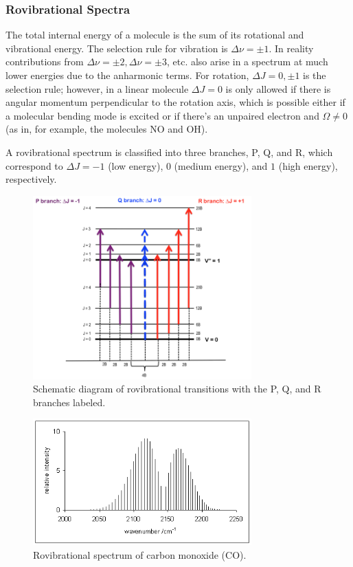 \documentclass{article}
\begin{document}
\subsubsection{Rovibrational Spectra}

The total internal energy of a molecule is the sum of its rotational and vibrational energy. The selection rule for vibration is  $\Delta \nu = \pm 1$. In reality contributions from $\Delta \nu = \pm 2, \Delta \nu = \pm 3$, etc. also arise in a spectrum at much lower energies due to the anharmonic terms. For rotation, $\Delta J = 0, \pm 1$ is the selection rule; however, in a linear molecule $\Delta J = 0$ is only allowed if there is angular momentum perpendicular to the rotation axis, which is possible either if a molecular bending mode is excited or if there's an unpaired electron and $\Omega \neq 0$ (as in, for example, the molecules NO and OH).

A rovibrational spectrum is classified into three branches, P, Q, and R, which correspond to $\Delta J = - 1$ (low energy), $0$ (medium energy), and $1$ (high energy), respectively.

\begin{figure}[ht]
    \centering
    \includegraphics[width = 0.75\textwidth]{figures/Pqr.png}
    \caption{Schematic diagram of rovibrational transitions with the P, Q, and R branches labeled.}
    \label{fig:pqr}
\end{figure}

\begin{figure}[ht]
    \centering
    \includegraphics[width = 0.75\textwidth]{figures/Co.png}
    \caption{Rovibrational spectrum of carbon monoxide (CO).}
    \label{fig:rovibrational}
\end{figure}
\end{document}
